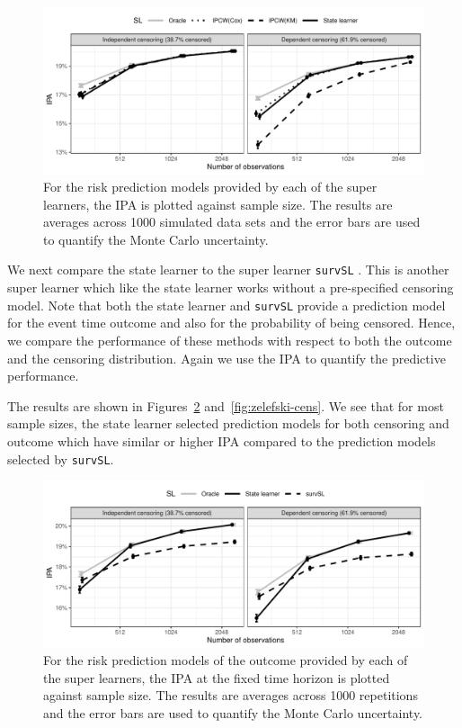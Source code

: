 \begin{figure}
  \centering %
  \includegraphics[width=1\linewidth]{experiment-fig-sl-ipcw.pdf}
  \caption[]{For the risk prediction models provided by each of the super
    learners, the IPA is plotted against sample size. The results are averages across 
    1000 simulated data sets and the error bars are used to quantify the Monte Carlo
    uncertainty.
  }
  \label{fig:ipcw-fail}
\end{figure}

We next compare the state learner to the super learner \texttt{survSL}
\citep{westling2021inference}. This is another super learner which
like the state learner works without a pre-specified censoring
model. Note that both the state learner and \texttt{survSL} provide a
prediction model for the event time outcome and also for the
probability of being censored. Hence, we compare the performance of
these methods with respect to both the outcome and the censoring
distribution. Again we use the IPA to quantify the predictive
performance.

The results are shown in Figures~\ref{fig:zelefski-out}
and~\ref{fig:zelefski-cens}. We see that for most sample sizes, the state
learner selected prediction models for both censoring and outcome which have
similar or higher IPA compared to the prediction models selected by
\texttt{survSL}.
\begin{figure}
  \centering %
  \includegraphics[width=1\linewidth]{experiment-fig-sl-survSL-out.pdf}
  \caption[]{For the risk prediction models of the outcome provided by each
    of the super learners, the IPA at the fixed time horizon is plotted against
    sample size. The results are averages across 1000 repetitions and the error
    bars are used to quantify the Monte Carlo uncertainty.}
  \label{fig:zelefski-out}
\end{figure}

